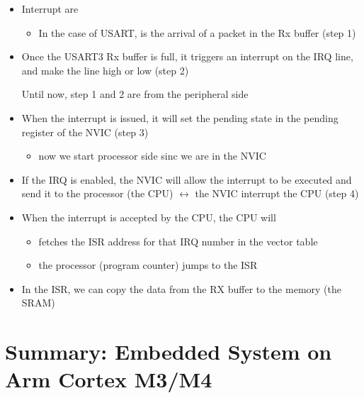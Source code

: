 \begin{itemize}

\item Interrupt are 

	\begin{itemize}
	\item In the case of USART, is the arrival of a packet in the Rx buffer (step 1)
	\end{itemize}
	
\item Once the USART3 Rx buffer is full, it triggers an interrupt on the IRQ line, and make the line high or low (step 2)

Until now, step 1 and 2 are from the peripheral side

\item When the interrupt is issued, it will set the pending state in the pending register of the NVIC (step 3)

	\begin{itemize}
	\item now we start processor side sinc we are in the NVIC
	\end{itemize}

\item If the IRQ is enabled, the NVIC will allow the interrupt to be executed and send it to the processor (the CPU) $\leftrightarrow$ the NVIC interrupt the CPU (step 4)

\item  When the interrupt is accepted by the CPU, the CPU will

	\begin{itemize}
	\item fetches the ISR address for that IRQ number in the vector table
	
	\item the processor (program counter) jumps to the ISR
	\end{itemize}

\item In the ISR, we can copy the data from the RX buffer to the memory (the SRAM)

\end{itemize}


\newpage
\section{Summary: Embedded System on Arm Cortex M3/M4}
\label{Chap:Arm_cortex:Summary}

